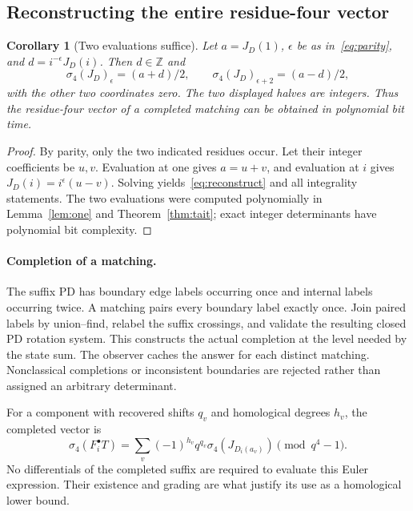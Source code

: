 \documentclass[11pt]{article}
\newtheorem{corollary}[theorem]{Corollary}
\theoremstyle{definition}
\theoremstyle{remark}
\newcommand{\Z}{\mathbb Z}
\newcommand{\sig}{\sigma_4}
\begin{document}
\subsection{Reconstructing the entire residue-four vector}
\begin{corollary}[Two evaluations suffice]\label{cor:fouroracle}
Let $a=J_D(1)$, $\epsilon$ be as in~\eqref{eq:parity}, and
$d=i^{-\epsilon}J_D(i)$. Then $d\in\Z$ and
\begin{equation}\label{eq:reconstruct}
 \sig(J_D)_\epsilon=(a+d)/2,\qquad
 \sig(J_D)_{\epsilon+2}=(a-d)/2,
\end{equation}
with the other two coordinates zero. The two displayed halves are integers.
Thus the residue-four vector of a completed matching can be obtained in
polynomial bit time.
\end{corollary}
\begin{proof}
By parity, only the two indicated residues occur. Let their integer
coefficients be $u,v$. Evaluation at one gives $a=u+v$, and evaluation at $i$
gives $J_D(i)=i^\epsilon(u-v)$. Solving yields~\eqref{eq:reconstruct} and all
integrality statements. The two evaluations were computed polynomially in
Lemma~\ref{lem:one} and Theorem~\ref{thm:tait}; exact integer determinants
have polynomial bit complexity.
\end{proof}

\paragraph{Completion of a matching.}
The suffix PD has boundary edge labels occurring once and internal labels
occurring twice. A matching pairs every boundary label exactly once. Join
paired labels by union--find, relabel the suffix crossings, and validate the
resulting closed PD rotation system. This constructs the actual completion
at the level needed by the state sum. The observer caches the answer for
each distinct matching. Nonclassical completions or inconsistent boundaries
are rejected rather than assigned an arbitrary determinant.

For a component with recovered shifts $q_v$ and homological degrees $h_v$,
the completed vector is
\begin{equation}\label{eq:objectsum}
 \sig(F_i^\bullet T)=\sum_v(-1)^{h_v}q^{q_v}
                     \sig(J_{D_i(a_v)})\pmod{q^4-1}.
\end{equation}
No differentials of the completed suffix are required to evaluate this
Euler expression. Their existence and grading are what justify its use as a
homological lower bound.
\end{document}
